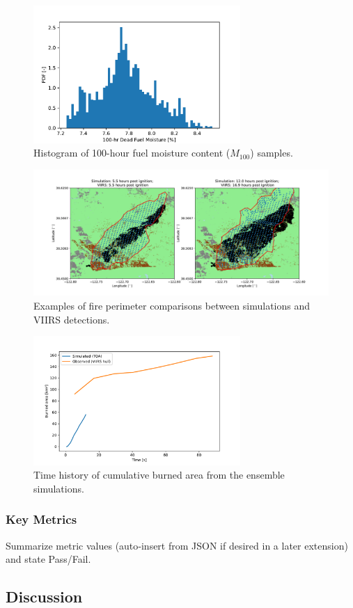 \documentclass[../report/case_report.tex]{subfiles}
\begin{document}
\begin{figure}[h]
  \centering
  \includegraphics[width=0.7\textwidth]{../figures/hist_m100.pdf}
  \caption{Histogram of 100-hour fuel moisture content ($M_{100}$) samples.}
  \label{fig:hist_m100}
\end{figure}

\begin{figure}[h]
  \centering
  \includegraphics[width=1.0\textwidth]{../figures/simu_vs_viirs_examples.pdf}
  \caption{Examples of fire perimeter comparisons between simulations and VIIRS detections.}
  \label{fig:simu_vs_viirs_examples}
\end{figure}

\begin{figure}[h]
  \centering
  \includegraphics[width=0.7\textwidth]{../figures/burn_area_history.pdf}
  \caption{Time history of cumulative burned area from the ensemble simulations.}
  \label{fig:burn_area_history}
\end{figure}


\subsubsection{Key Metrics}
Summarize metric values (auto‑insert from JSON if desired in a later extension) and state Pass/Fail.


\subsection{Discussion}
\end{document}
